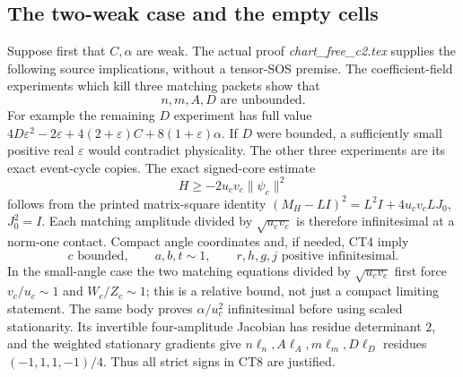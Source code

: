 \subsection{The two-weak case and the empty cells}

Suppose first that \(C,\alpha\) are weak.  The actual proof
\emph{chart\_free\_c2.tex} supplies the following source implications,
without a tensor-SOS premise.  The coefficient-field experiments
which kill three matching packets show that
\[
                    n,m,A,D\text{ are unbounded}.             \tag{CT7}
\]
For example the remaining \(D\) experiment has full value
\(4D\varepsilon^2-2\varepsilon+4(2+\varepsilon)C
+8(1+\varepsilon)\alpha\).
If \(D\) were bounded, a sufficiently small positive real
\(\varepsilon\) would contradict physicality.  The other three
experiments are its exact event-cycle copies.
The exact signed-core estimate
\[
 H\geq-2u_cv_c\|\psi_c\|^2
\]
follows from the printed matrix-square identity
\((M_H-LI)^2=L^2I+4u_cv_cLJ_0\), \(J_0^2=I\).
Each matching amplitude divided by \(\sqrt{u_cv_c}\) is therefore
infinitesimal at a norm-one contact.  Compact angle coordinates
and, if needed, CT4 imply
\[
 c\text{ bounded},\qquad a,b,t\sim1,\qquad
 r,h,g,j\text{ positive infinitesimal}.                    \tag{CT8}
\]
In the small-angle case the two matching equations divided by
\(\sqrt{u_cv_c}\) first force \(v_c/u_c\sim1\) and \(W_c/Z_c\sim1\);
this is a relative bound, not just a compact limiting statement.
The same body proves \(\alpha/u_c^2\) infinitesimal before using
scaled stationarity.  Its invertible four-amplitude Jacobian has
residue determinant \(2\), and the weighted stationary gradients
give \(n\ell_n,A\ell_A,m\ell_m,D\ell_D\) residues
\((-1,1,1,-1)/4\).  Thus all strict signs in CT8 are justified.

